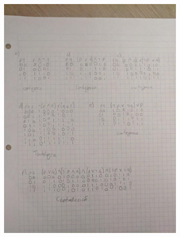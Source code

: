 \documentclass[12pt, fleqn]{article}                            %
\theoremstyle{break}                                            %
\begin{document}
\begin{figure}[h]
    \centering
    \includegraphics[width=0.8\textwidth]{9}
\end{figure}

\clearpage
\end{document}
